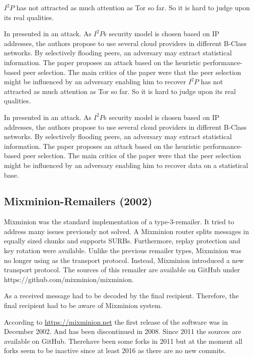 $I^2P$ has not attracted as much attention as Tor so far. So it is hard to judge upon its real qualities.

In \citeyear{pets2011-i2p} \citeauthor{pets2011-i2p} presented in \cite{pets2011-i2p} an attack. As $I^2P$s security model is chosen based on IP addresses, the authors propose to use several cloud providers in different B-Class networks. By selectively flooding peers, an adversary may extract statistical information. The paper proposes an attack based on the heuristic performance-based peer selection. The main critics of the paper were that the peer selection might be influenced by an adversary enabling him to recover $I^2P$ has not attracted as much attention as Tor so far. So it is hard to judge upon its real qualities.

In \citeyear{pets2011-i2p} \citeauthor{pets2011-i2p} presented in \cite{pets2011-i2p} an attack. As $I^2P$s security model is chosen based on IP addresses, the authors propose to use several cloud providers in different B-Class networks. By selectively flooding peers, an adversary may extract statistical information. The paper proposes an attack based on the heuristic performance-based peer selection. The main critics of the paper were that the peer selection might be influenced by an adversary enabling him to recover data on a statistical base.

\subsection{Mixminion-Remailers (2002)\label{sec:remMixminion}}
Mixminion was the standard implementation of a type-3-remailer. It tried to address many issues previously not solved. A Mixminion router splits messages in equally sized chunks and supports SURBs. Furthermore,  replay protection and key rotation were available. Unlike the previous remailer types, Mixminion was no longer using  as the transport protocol. Instead, Mixminion introduced a new transport protocol. The sources of this remailer are available on GitHub under https://github.com/mixminion/mixminion.

As a received message had to be decoded by the final recipient. Therefore, the final recipient had to be aware of Mixminion system.

According to \url{https://mixminion.net} the first release of the software was in December 2002. And has been discontinued in 2008. Since 2011 the sources are available on GitHub. Therehave been some forks in 2011 but at the moment all forks seem to be inactive since at least 2016 as there are no new commits.

